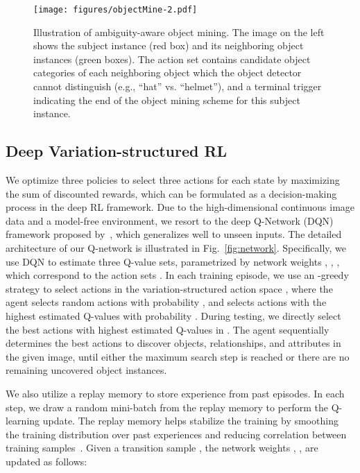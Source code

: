 \documentclass[10pt,twocolumn,letterpaper]{article}
\begin{document}
 \begin{figure}[!tp]
 	\begin{center}
 		\texttt{[image: figures/objectMine-2.pdf]}
 		\caption{{Illustration of ambiguity-aware object mining. The image on the left shows the subject instance (red box) and its neighboring object instances (green boxes). The action set  contains candidate object categories of each neighboring object which the object detector cannot distinguish (e.g., ``hat'' vs. ``helmet''), and a terminal trigger indicating the end of the object mining scheme for this subject instance. }}
 		\label{fig:objectMine}
 	\end{center}
 	\vspace{-9mm}
 \end{figure}
 
\subsection{Deep Variation-structured RL}

We optimize three policies to select three actions for each state by maximizing the sum of discounted rewards, which can be formulated as a decision-making process in the deep RL framework. Due to the high-dimensional continuous image data and a model-free environment, we resort to the deep Q-Network (DQN) framework proposed by~\cite{mnih2013playing, mnih2015human}, which generalizes well to unseen inputs. The detailed architecture of our Q-network is illustrated in Fig.~\ref{fig:network}. Specifically, we use DQN to estimate three Q-value sets, parametrized by network weights , , , which correspond to the action sets .  In each training episode, we use an -greedy strategy to select actions  in the variation-structured action space , where the agent selects random actions with probability , and selects actions with the highest estimated Q-values with probability . During testing, we directly select the best actions with highest estimated Q-values in . The agent sequentially determines the best actions to discover objects, relationships, and attributes in the given image, until either the maximum search step is reached or there are no remaining uncovered object instances.

We also {utilize a replay memory to store experience from past episodes. In each step, we draw a random mini-batch from the replay memory to perform the Q-learning update. The replay memory helps stabilize the training by smoothing the training distribution over past experiences and reducing correlation between training samples~\cite{mnih2013playing, mnih2015human}.} Given {a transition sample} , the network weights , ,  are updated as follows:
\end{document}
